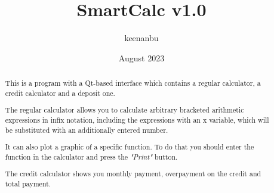 \documentclass[a4paper, 12pt]{article}
\title{SmartCalc v1.0}
\author{keenanbu}
\date{August 2023}
\begin{document}
\maketitle
\newpage
\begin{abstract}
This is a program with a Qt-based interface which contains a regular calculator, a credit calculator and a deposit one.

The regular calculator allows you to calculate arbitrary bracketed arithmetic expressions in infix notation, including the expressions with an x variable, which will be substituted with an additionally entered number.

It can also plot a graphic of a specific function. To do that you should enter the function in the calculator and press the \textit{"Print"} button.

\newpage

{\parskip 10mm The credit calculator shows you monthly payment, overpayment on the credit and total payment.}

\newpage


\end{abstract}
\end{document}
